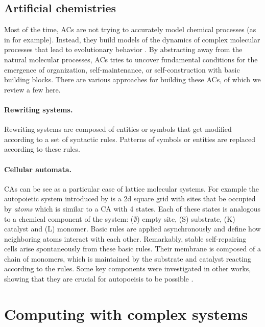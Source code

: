 \subsection{Artificial chemistries}
Most of the time, \acp{AC} are not trying to accurately model chemical processes
(as in \parencite{ostrovskyCellularAutomataPolymer2001} for example). Instead,
they build models of the dynamics of complex molecular processes that lead to
evolutionary behavior \parencite{dittrichArtificialChemistriesReview2001}. By
abstracting away from the natural molecular processes, \acp{AC} tries to uncover
fundamental conditions for the emergence of organization, self-maintenance, or
self-construction with basic building blocks. There are various approaches for
building these \aclp{AC}, of which we review a few here.

\paragraph{Rewriting systems.}
Rewriting systems are composed of entities or symbols that get modified
according to a set of syntactic rules. Patterns of symbols or entities are
replaced according to these rules.

\paragraph{Cellular automata.}
\Acfp{CA} can be see as a particular case of lattice molecular systems. For
example the autopoietic system introduced by
\textcite{varelaAutopoiesisOrganizationLiving1991} is a 2d square grid with sites
that be occupied by \emph{atoms} which is similar to a \ac{CA} with 4 states.
Each of these states is analogous to a chemical component of the system: ($\emptyset$)
empty site, (S) substrate, (K) catalyst and (L) monomer. Basic rules are applied
asynchronously and define how neighboring atoms interact with each other.
Remarkably, stable self-repairing cells arise spontaneously from these basic
rules. Their membrane is composed of a chain of monomers, which is maintained by
the substrate and catalyst reacting according to the rules. Some key components
were investigated in other works, showing that they are crucial for autopoeisis
to be possible \parencite{zelenySelforganizationLivingSystems1977,
  mcmullinRediscoveringComputationalAutopoiesis1997}.

\section{Computing with complex systems}\label{sec:comp-with-compl}

